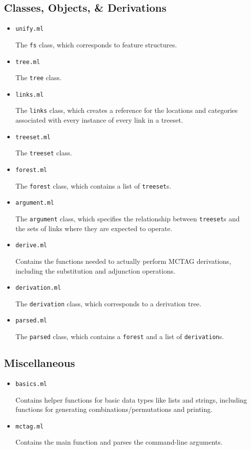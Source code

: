 \documentclass[10.5pt]{article}
\newcommand{\code}[1]{\texttt{#1}}
\begin{document}
\subsection{Classes, Objects, \& Derivations}
\begin{itemize}
	\item \code{unify.ml}
	
	The \code{fs} class, which corresponds to feature structures.
	\item \code{tree.ml}
	
	The \code{tree} class.
	\item \code{links.ml}
	
	The \code{links} class, which creates a reference for the locations and categories associated with every instance of every link in a treeset.
	\item \code{treeset.ml}
	
	The \code{treeset} class.
	\item \code{forest.ml}
	
	The \code{forest} class, which contains a list of \code{treeset}s.
	\item \code{argument.ml}
	
	The \code{argument} class, which specifies the relationship between \code{treeset}s and the sets of links where they are expected to operate.
	\item \code{derive.ml}
	
	Contains the functions needed to actually perform MCTAG derivations, including the substitution and adjunction operations.
	\item \code{derivation.ml}
	
	The \code{derivation} class, which corresponds to a derivation tree.
	\item \code{parsed.ml}
	
	The \code{parsed} class, which contains a \code{forest} and a list of \code{derivation}s.
\end{itemize}

\subsection{Miscellaneous}
\begin{itemize}
	\item \code{basics.ml}
	
	Contains helper functions for basic data types like lists and strings, including functions for generating combinations/permutations and printing.
	\item \code{mctag.ml}
	
	Contains the main function and parses the command-line arguments.
\end{itemize}
\end{document}
